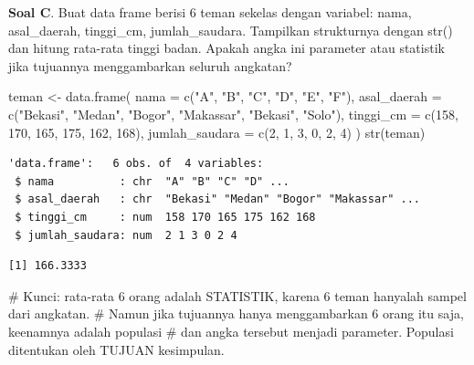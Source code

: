 \documentclass[
  indonesian,
  letterpaper,
]{book}
\newenvironment{Shaded}{\begin{snugshade}}{\end{snugshade}}
\newcommand{\AttributeTok}[1]{\textcolor[rgb]{0.40,0.45,0.13}{#1}}
\newcommand{\CommentTok}[1]{\textcolor[rgb]{0.37,0.37,0.37}{#1}}
\newcommand{\DecValTok}[1]{\textcolor[rgb]{0.68,0.00,0.00}{#1}}
\newcommand{\FunctionTok}[1]{\textcolor[rgb]{0.28,0.35,0.67}{#1}}
\newcommand{\NormalTok}[1]{\textcolor[rgb]{0.00,0.23,0.31}{#1}}
\newcommand{\OtherTok}[1]{\textcolor[rgb]{0.00,0.23,0.31}{#1}}
\newcommand{\SpecialCharTok}[1]{\textcolor[rgb]{0.37,0.37,0.37}{#1}}
\newcommand{\StringTok}[1]{\textcolor[rgb]{0.13,0.47,0.30}{#1}}
\begin{document}
\textbf{Soal C}. Buat data frame berisi 6 teman sekelas dengan variabel:
nama, asal\_daerah, tinggi\_cm, jumlah\_saudara. Tampilkan strukturnya
dengan str() dan hitung rata-rata tinggi badan. Apakah angka ini
parameter atau statistik jika tujuannya menggambarkan seluruh angkatan?

\begin{Shaded}
\begin{Highlighting}[]
\NormalTok{teman }\OtherTok{\textless{}{-}} \FunctionTok{data.frame}\NormalTok{(}
\AttributeTok{nama =} \FunctionTok{c}\NormalTok{(}\StringTok{"A"}\NormalTok{, }\StringTok{"B"}\NormalTok{, }\StringTok{"C"}\NormalTok{, }\StringTok{"D"}\NormalTok{, }\StringTok{"E"}\NormalTok{, }\StringTok{"F"}\NormalTok{),}
\AttributeTok{asal\_daerah =} \FunctionTok{c}\NormalTok{(}\StringTok{"Bekasi"}\NormalTok{, }\StringTok{"Medan"}\NormalTok{, }\StringTok{"Bogor"}\NormalTok{, }\StringTok{"Makassar"}\NormalTok{, }\StringTok{"Bekasi"}\NormalTok{, }\StringTok{"Solo"}\NormalTok{),}
\AttributeTok{tinggi\_cm =} \FunctionTok{c}\NormalTok{(}\DecValTok{158}\NormalTok{, }\DecValTok{170}\NormalTok{, }\DecValTok{165}\NormalTok{, }\DecValTok{175}\NormalTok{, }\DecValTok{162}\NormalTok{, }\DecValTok{168}\NormalTok{),}
\AttributeTok{jumlah\_saudara =} \FunctionTok{c}\NormalTok{(}\DecValTok{2}\NormalTok{, }\DecValTok{1}\NormalTok{, }\DecValTok{3}\NormalTok{, }\DecValTok{0}\NormalTok{, }\DecValTok{2}\NormalTok{, }\DecValTok{4}\NormalTok{)}
\NormalTok{)}
\FunctionTok{str}\NormalTok{(teman)}
\end{Highlighting}
\end{Shaded}

\begin{verbatim}
'data.frame':   6 obs. of  4 variables:
 $ nama          : chr  "A" "B" "C" "D" ...
 $ asal_daerah   : chr  "Bekasi" "Medan" "Bogor" "Makassar" ...
 $ tinggi_cm     : num  158 170 165 175 162 168
 $ jumlah_saudara: num  2 1 3 0 2 4
\end{verbatim}

\begin{Shaded}
\end{Shaded}

\begin{verbatim}
[1] 166.3333
\end{verbatim}

\begin{Shaded}
\begin{Highlighting}[]
\CommentTok{\# Kunci: rata{-}rata 6 orang adalah STATISTIK, karena 6 teman hanyalah sampel dari angkatan.}
\CommentTok{\# Namun jika tujuannya hanya menggambarkan 6 orang itu saja, keenamnya adalah populasi}
\CommentTok{\# dan angka tersebut menjadi parameter. Populasi ditentukan oleh TUJUAN kesimpulan.}
\end{Highlighting}
\end{Shaded}
\end{document}
